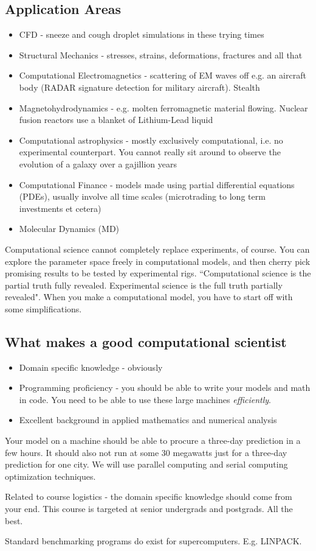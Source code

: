 \documentclass[a4paper]{article}
\begin{document}
\subsection*{Application Areas}
\begin{itemize}
	\item CFD - sneeze and cough droplet simulations in these trying times
	\item Structural Mechanics - stresses, strains, deformations, fractures and all that
	\item Computational Electromagnetics - scattering of EM waves off e.g. an aircraft body (RADAR signature detection for military aircraft). Stealth
	\item Magnetohydrodynamics - e.g. molten ferromagnetic material flowing. Nuclear fusion reactors use a blanket of Lithium-Lead liquid
	\item Computational astrophysics - mostly exclusively computational, i.e. no experimental counterpart. You cannot really sit around to observe the evolution of a galaxy over a gajillion years
	\item Computational Finance - models made using partial differential equations (PDEs), usually involve all time scales (microtrading to long term investments et cetera)
	\item Molecular Dynamics (MD)
\end{itemize}

Computational science cannot completely replace experiments, of course.
You can explore the parameter space freely in computational models, and
then cherry pick promising results to be tested by experimental rigs.
``Computational science is the partial truth fully revealed. Experimental
science is the full truth partially revealed". When you make a computational
model, you have to start off with some simplifications.

\subsection*{What makes a good computational scientist}
\begin{itemize}
	\item Domain specific knowledge - obviously
	\item Programming proficiency - you should be able to write your models and math in code. You need to be able to use these large
		machines \emph{efficiently}.
	\item Excellent background in applied mathematics and numerical analysis
\end{itemize}

Your model on a machine should be able to procure a three-day prediction
in a few hours. It should also not run at some 30 megawatts just for
a three-day prediction for one city. We will use parallel computing
and serial computing optimization techniques.

Related to course logistics - the domain specific knowledge should
come from your end. This course is targeted at senior undergrads and 
postgrads. All the best.

Standard benchmarking programs do exist for supercomputers. E.g. LINPACK.
\end{document}
